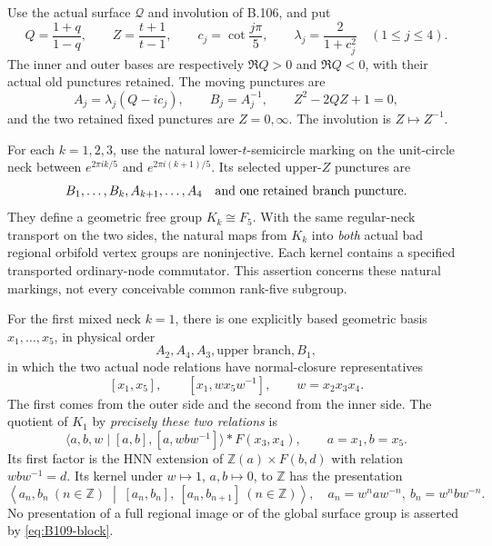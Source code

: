 \label{stmt:B109}
Use the actual surface $\mathscr Q$ and involution of B.106, and put
\[
 Q=\frac{1+q}{1-q},\qquad Z=\frac{t+1}{t-1},\qquad
 c_j=\cot\frac{j\pi}{5},\qquad \lambda_j=\frac{2}{1+c_j^2}
 \quad(1\le j\le4).
\]
The inner and outer bases are respectively $\Re Q>0$ and $\Re Q<0$,
with their actual old punctures retained. The moving punctures are
\begin{equation}\label{eq:B109-points}
 A_j=\lambda_j(Q-i c_j),\qquad B_j=A_j^{-1},\qquad
 Z^2-2QZ+1=0,
\end{equation}
and the two retained fixed punctures are $Z=0,\infty$.
The involution is $Z\mapsto Z^{-1}$.

For each $k=1,2,3$, use the natural lower-$t$-semicircle marking on
the unit-circle neck between $e^{2\pi i k/5}$ and
$e^{2\pi i(k+1)/5}$. Its selected upper-$Z$ punctures are
\[
 B_1,\ldots,B_k,A_{k+1},\ldots,A_4
 \quad\hbox{and one retained branch puncture}.
\]
They define a geometric free group $K_k\cong F_5$. With the same
regular-neck transport on the two sides, the natural maps from
$K_k$ into \emph{both} actual bad regional orbifold vertex groups
are noninjective. Each kernel contains a specified transported
ordinary-node commutator. This assertion concerns these natural
markings, not every conceivable common rank-five subgroup.

For the first mixed neck $k=1$, there is one explicitly based
geometric basis $x_1,\ldots,x_5$, in physical order
\[
 A_2,A_4,A_3,\text{upper branch},B_1,
\]
in which the two actual node relations have normal-closure
representatives
\begin{equation}\label{eq:B109-two-relations}
 [x_1,x_5],\qquad [x_1,w x_5w^{-1}],\qquad w=x_2x_3x_4.
\end{equation}
The first comes from the outer side and the second from the inner
side. The quotient of $K_1$ by \emph{precisely these two relations}
is
\begin{equation}\label{eq:B109-block}
 \langle a,b,w\mid[a,b],[a,wbw^{-1}]\rangle
       *F(x_3,x_4),\qquad a=x_1, b=x_5.
\end{equation}
Its first factor is the HNN extension of
$\mathbb Z(a)\times F(b,d)$ with relation $wbw^{-1}=d$.
Its kernel under $w\mapsto1$, $a,b\mapsto0$, to $\mathbb Z$ has
the presentation
\begin{equation}\label{eq:B109-path}
 \left\langle a_n,b_n\ (n\in\mathbb Z)\;\middle|\;
 [a_n,b_n],\ [a_n,b_{n+1}]\ (n\in\mathbb Z)\right\rangle,
 \quad a_n=w^naw^{-n},\ b_n=w^nbw^{-n}.
\end{equation}
No presentation of a full regional image or of the global surface
group is asserted by \eqref{eq:B109-block}.

